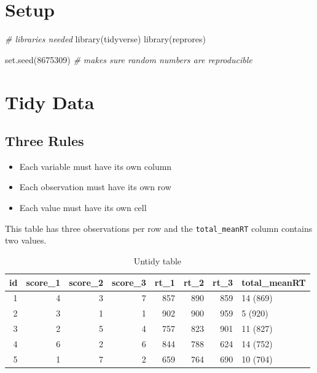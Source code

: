 \documentclass[
  oneside]{book}
\newenvironment{Shaded}{\begin{snugshade}}{\end{snugshade}}
\newcommand{\CommentTok}[1]{\textcolor[rgb]{0.56,0.35,0.01}{\textit{#1}}}
\newcommand{\DecValTok}[1]{\textcolor[rgb]{0.00,0.00,0.81}{#1}}
\newcommand{\FunctionTok}[1]{\textcolor[rgb]{0.00,0.00,0.00}{#1}}
\newcommand{\NormalTok}[1]{#1}
\providecommand{\tightlist}{%
  \setlength{\itemsep}{0pt}\setlength{\parskip}{0pt}}
\begin{document}
\hypertarget{setup-tidyr}{%
\section{Setup}\label{setup-tidyr}}

\begin{Shaded}
\begin{Highlighting}[]
\CommentTok{\# libraries needed}
\FunctionTok{library}\NormalTok{(tidyverse)}
\FunctionTok{library}\NormalTok{(reprores)}

\FunctionTok{set.seed}\NormalTok{(}\DecValTok{8675309}\NormalTok{) }\CommentTok{\# makes sure random numbers are reproducible}
\end{Highlighting}
\end{Shaded}

\hypertarget{tidy-data}{%
\section{Tidy Data}\label{tidy-data}}

\hypertarget{three-rules}{%
\subsection{Three Rules}\label{three-rules}}

\begin{itemize}
\tightlist
\item
  Each variable must have its own column
\item
  Each observation must have its own row
\item
  Each value must have its own cell
\end{itemize}

This table has three observations per row and the \texttt{total\_meanRT} column contains two values.

\begin{table}

\caption{\label{tab:unnamed-chunk-1}Untidy table}
\centering
\begin{tabular}[t]{r|r|r|r|r|r|r|l}
\hline
id & score\_1 & score\_2 & score\_3 & rt\_1 & rt\_2 & rt\_3 & total\_meanRT\\
\hline
1 & 4 & 3 & 7 & 857 & 890 & 859 & 14 (869)\\
\hline
2 & 3 & 1 & 1 & 902 & 900 & 959 & 5 (920)\\
\hline
3 & 2 & 5 & 4 & 757 & 823 & 901 & 11 (827)\\
\hline
4 & 6 & 2 & 6 & 844 & 788 & 624 & 14 (752)\\
\hline
5 & 1 & 7 & 2 & 659 & 764 & 690 & 10 (704)\\
\hline
\end{tabular}
\end{table}
\end{document}
